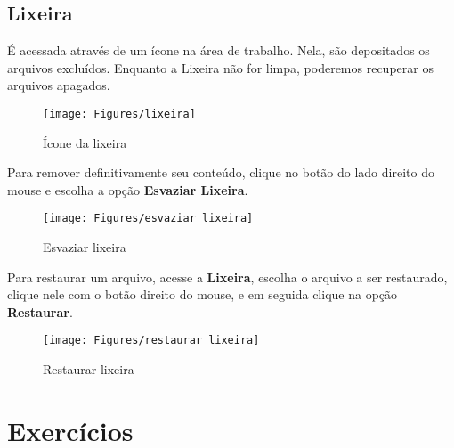 \documentclass[12pt]{article}
\begin{document}
		\subsection{Lixeira}
		
		É acessada através de um ícone na área de trabalho. Nela, são depositados os arquivos excluídos. Enquanto a Lixeira não for limpa, poderemos recuperar os arquivos apagados.
		
		\begin{figure}[!h]
			\centering
			\texttt{[image: Figures/lixeira]}
			\caption{Ícone da lixeira}
			\label{fig:lixeira}
		\end{figure}
		\newpage
		Para remover definitivamente seu conteúdo, clique no botão do lado direito do mouse e escolha a opção {\bf Esvaziar Lixeira}.
		
		\begin{figure}[!h]
			\centering
			\texttt{[image: Figures/esvaziar\_lixeira]}
			\caption{Esvaziar lixeira}
			\label{fig:esvaziar_lixeira}
		\end{figure}
		
		Para restaurar um arquivo, acesse a {\bf Lixeira}, escolha o arquivo a ser restaurado, clique nele com o botão direito do mouse, e em seguida clique na opção {\bf Restaurar}.
		
		\begin{figure}[!h]
			\centering
			\texttt{[image: Figures/restaurar\_lixeira]}
			\caption{Restaurar lixeira}
			\label{fig: restaurar_lixeira}
		\end{figure}
		
		\section{Exercícios}
		
\end{document}

